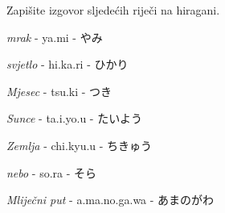 
\author{Katja Kržišnik, Marko Barbančić}


	\begin{mondai}{Zapišite izgovor sljedećih riječi na hiragani.}
		\item \textit{mrak} - ya.mi - やみ
		\item \textit{svjetlo} - hi.ka.ri - ひかり
		\item \textit{Mjesec} - tsu.ki - つき
		\item \textit{Sunce} - ta.i.yo.u - たいよう
		\item \textit{Zemlja} - chi.kyu.u - ちきゅう
		\item \textit{nebo} - so.ra - そら
		\item \textit{Mliječni put} - a.ma.no.ga.wa - あまのがわ
	\end{mondai}

